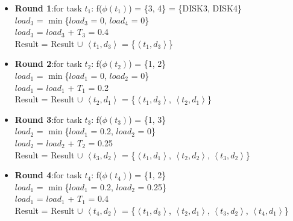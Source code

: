 \documentclass[conference]{IEEEtran}
\begin{document}
\begin{itemize}
	\item \textbf{Round 1}:for task  $t_1$:
	 f($\phi(t_1)$) = \{3, 4\} = \{DISK3, DISK4\}\\
	 $load_3$ = $\min$\{$load_3$ = 0, $load_4$ = 0\}\\
	 $load_3$ = $load_3$ + $T_3$ = 0.4\\
	Result = Result $\cup$ $\left \langle t_1, d_{3}\right \rangle$ = \{$\left \langle t_1, d_{3}\right \rangle$\}
	\item \textbf{Round 2}:for task  $t_2$:
	f($\phi(t_2)$) = \{1, 2\}\\
	$load_1$ = $\min$\{$load_1$ = 0, $load_2$ = 0\}\\
	$load_1$ = $load_1$ + $T_1$ = 0.2\\
	Result = Result $\cup$ $\left \langle t_2, d_{1}\right \rangle$ = \{$\left \langle t_1, d_{3}\right \rangle$, $\left \langle t_2, d_{1}\right \rangle$\}
	\item \textbf{Round 3}:for task  $t_3$:
	f($\phi(t_3)$) = \{1, 3\}\\
	$load_2$ = $\min$\{$load_1$ = 0.2, $load_2$ = 0\}\\
	$load_2$ = $load_2$ + $T_2$ = 0.25\\
	Result = Result $\cup$ $\left \langle t_3, d_{2}\right \rangle$ = \{$\left \langle t_1, d_{1}\right \rangle$, $\left \langle t_2, d_{2}\right \rangle$,  $\left \langle t_3, d_{2}\right \rangle$\}
	\item \textbf{Round 4}:for task  $t_4$:
	f($\phi(t_4)$) = \{1, 2\}\\
	$load_1$ = $\min$\{$load_1$ = 0.2, $load_2$ = 0.25\}\\
	$load_1$ = $load_1$ + $T_1$ = 0.4\\
	Result = Result $\cup$ $\left \langle t_4, d_{2}\right \rangle$ = \{$\left \langle t_1, d_{3}\right \rangle$, $\left \langle t_2, d_{1}\right \rangle$,  $\left \langle t_3, d_{2}\right \rangle$, $\left \langle t_4, d_{1}\right \rangle$\}
	

\end{itemize}
\end{document}
